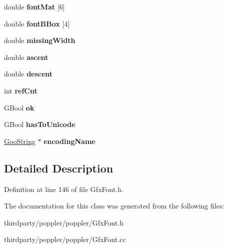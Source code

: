 \begin{DoxyCompactItemize}
double {\bfseries font\+Mat} \mbox{[}6\mbox{]}
\item 
\mbox{\label{class_gfx_font_a1f9ff2ad2c28353f07eba4a9a39dd0f5}} 
double {\bfseries font\+B\+Box} \mbox{[}4\mbox{]}
\item 
\mbox{\label{class_gfx_font_ac0e0941c3037cb89ac16b9743a088ed7}} 
double {\bfseries missing\+Width}
\item 
\mbox{\label{class_gfx_font_a3cebacd299a1f35fa7cadbe95db70c4a}} 
double {\bfseries ascent}
\item 
\mbox{\label{class_gfx_font_a6bb36ee4200f55d7b1bb9a0901321ce7}} 
double {\bfseries descent}
\item 
\mbox{\label{class_gfx_font_a9538a5d40b61fde9c4ce6137bcf76839}} 
int {\bfseries ref\+Cnt}
\item 
\mbox{\label{class_gfx_font_aa20f29a1507ec7c4954e04bfa666b592}} 
G\+Bool {\bfseries ok}
\item 
\mbox{\label{class_gfx_font_a535f6f0e3e705b4caf1272f79e95cc74}} 
G\+Bool {\bfseries has\+To\+Unicode}
\item 
\mbox{\label{class_gfx_font_acf90978c7c0c2655423d4898bcce408f}} 
\hyperlink{class_goo_string}{Goo\+String} $\ast$ {\bfseries encoding\+Name}
\end{DoxyCompactItemize}


\subsection{Detailed Description}


Definition at line 146 of file Gfx\+Font.\+h.



The documentation for this class was generated from the following files\+:\begin{DoxyCompactItemize}
\item 
thirdparty/poppler/poppler/Gfx\+Font.\+h\item 
thirdparty/poppler/poppler/Gfx\+Font.\+cc\end{DoxyCompactItemize}
